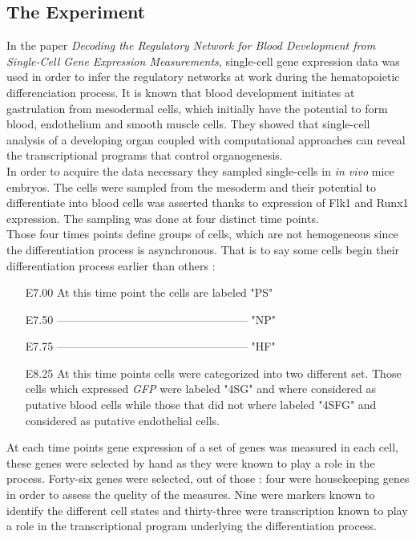 \documentclass[a4paper,12pt]{book}
\theoremstyle{break}
\begin{document}
\subsection*{The Experiment}
	In the paper \textit{Decoding the Regulatory Network for Blood Development from Single-Cell Gene Expression Measurements}, single-cell gene expression data was used in order to infer the regulatory networks at work during the hematopoietic differenciation process. It is known that blood development
	initiates at gastrulation from mesodermal cells, which initially have the potential to form blood, endothelium and smooth muscle cells. They showed that single-cell analysis of a developing organ coupled with computational approaches can reveal the transcriptional programs that control organogenesis.\\
	In order to acquire the data necessary they sampled single-cells in \textit{in vivo} mice embryos. The cells were sampled from the mesoderm and their potential to differentiate into blood cells was asserted thanks to expression of Flk1 and Runx1 expression. The sampling was done at four distinct time points.\\
	Those four times points define groups of cells, which are not hemogeneous since the differentiation process is asynchronous. That is to say some cells begin their differentiation process earlier than others :
	\begin{itemize}
		\item[E7.00] At this time point the cells are labeled "PS"
		\item[E7.50] –––––––––––––––––––––––––––––––––– "NP"
		\item[E7.75] –––––––––––––––––––––––––––––––––– "HF"
		\item[E8.25] At this time points cells were categorized into two different set. Those cells which expressed \textit{GFP} were labeled "4SG" and where considered as putative blood cells while those that did not where labeled "4SFG" and considered as putative endothelial cells. 
	\end{itemize}
	At each time points gene expression of a set of genes was measured in each cell, these genes were selected by hand as they were known to play a role in the process. Forty-six genes were selected, out of those : four were housekeeping genes in order to assess the quelity of the measures. Nine were markers known to identify the different cell states and thirty-three were transcription known to play a role in the transcriptional program underlying the differentiation process. 
\end{document}
